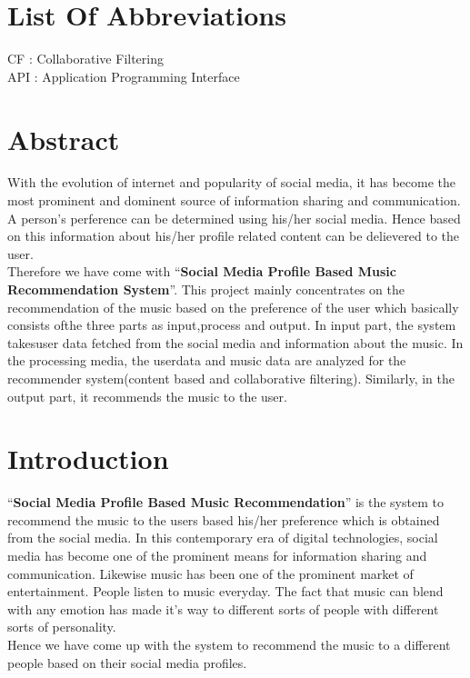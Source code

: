 \documentclass{article}
\begin{document}
\tableofcontents
\thispagestyle{empty}
\cleardoublepage


\listoffigures
\thispagestyle{empty}
\cleardoublepage

\section*{List Of Abbreviations}
\thispagestyle{empty}
CF : Collaborative Filtering\\
API : Application Programming Interface

\cleardoublepage

\section*{Abstract}
With the evolution of internet and popularity of social media, it has become the most prominent and dominent source of information sharing and communication. A person's perference can be determined using his/her social media. Hence based on this information about his/her profile related content can be delievered to the user.\\
Therefore we have come with ``\textbf{Social Media Profile Based Music Recommendation System}''. This project mainly concentrates on the recommendation of the music based on the preference of the user which basically consists ofthe three parts as input,process and output. In input part, the system takesuser data fetched from the social media and information about the music. In the processing media, the userdata and music data are analyzed for the recommender system(content based and collaborative filtering). Similarly, in the output part, it recommends the music to the user.
\thispagestyle{empty}
\cleardoublepage
{}
\section{Introduction}
	``\textbf{Social Media Profile Based Music Recommendation}'' is the system to recommend the music to the users based his/her preference which is obtained from the social media. In this contemporary era of digital technologies, social media has become one of the prominent means for information sharing and communication. Likewise music has been one of the prominent market of entertainment. People listen to music everyday. The fact that music can blend with any emotion has made it's way to different sorts of people with different sorts of personality.\\
	Hence we have come up with the system to recommend the music to a different people based on their social media profiles.
\cleardoublepage
\end{document}
